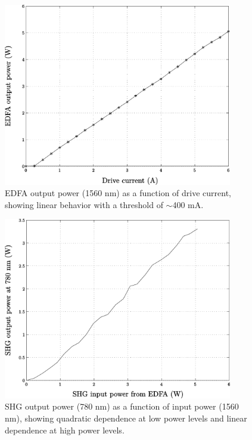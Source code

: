 \begin{figure}[h]
\begin{center}
\includegraphics[width=10cm]{figure-pcoct-edfapower.pdf}
\caption{EDFA output power (1560 nm) as a function of drive current, showing linear behavior with a threshold of $\sim$400 mA.}
\label{figure:pcoct-edfapower}
\end{center}
\end{figure}

\begin{figure}[h]
\begin{center}
\includegraphics[width=10cm]{figure-pcoct-shg.pdf}
\caption{SHG output power (780 nm) as a function of input power (1560 nm), showing quadratic dependence at low power levels and linear dependence at high power levels.}
\label{figure:pcoct-shg}
\end{center}
\end{figure}

